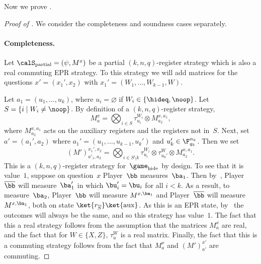 Now we prove .
\begin{proof}[Proof of ]
We consider the completeness and soundness cases separately.

\paragraph{Completeness.}
Let $\calS_{\mathrm{partial}} = (\psi, M^x)$ be a partial
$(k,n,q)$-register strategy which is also a real commuting EPR strategy.
To this strategy we will add matrices for the questions $x' = (x_1', x_2)$ with $x_1' = (W_1, \ldots, W_{k-1}, W)$.

Let $a_1 = (u_1, \ldots, u_k)$, where $u_i = \varnothing$ if $W_i \in \{\hideq, \noop\}$.
Let~$S = \{i \mid W_i \neq \noop\}$.
By definition of a $(k, n, q)$-register strategy,
\begin{equation*}
M^x_a = \bigotimes_{i \in S} \tau^{W_i}_{u_i} \otimes M^{x, a_1}_{a_2},
\end{equation*}
where $M^{x,a_1}_{a_2}$ acts on the auxiliary registers and the registers not in~$S$.
Next, set $a' = (a_1', a_2)$ where $a_1' = (u_1, \ldots, u_{k-1}, u_k')$ and $u_k' \in \F_{q_k}^{n_k}$.  Then we set
\begin{equation*}
(M')^{x_1', x_2}_{a'_1, a_2} = \bigotimes_{i \in S\setminus k} \tau^{W_i}_{u_i} \otimes \tau^{W}_{u_k'} \otimes M^{x, a_1}_{a_2}.
\end{equation*}
This is a $(k,n,q)$-register strategy for~$\game_{\mathrm{hide}}$ by design.
To see that it is value~$1$, suppose on question~$x$ Player~$\bb$ measures~$\ba_1$.
Then by~, Player~$\overline{\bb}$ will measure~$\ba_1'$ in which $\bu_i' = \bu_i$ for all $i < k$.
As a result, to measure~$\ba_2$, Player~$\bb$ will measure $M^{x, \ba_1}$
and Player~$\overline{\bb}$ will measure $M^{x, \ba_1}$, both on state $\ket{r_{\overline{S}}}\ket{\mathrm{aux}}$.
As this is an EPR state,
by~
the outcomes will always be the same, and so this strategy has
value~$1$. The fact that this a real strategy follows from the
assumption that the matrices $M^x_a$ are real, and the fact that for
$W \in \{X, Z\}$, $\tau^W_u$ is a real matrix.
Finally, the fact that this is a commuting strategy follows from the fact that $M^x_a$ and $(M')^{x'}_{a'}$ are commuting.


\end{proof}
